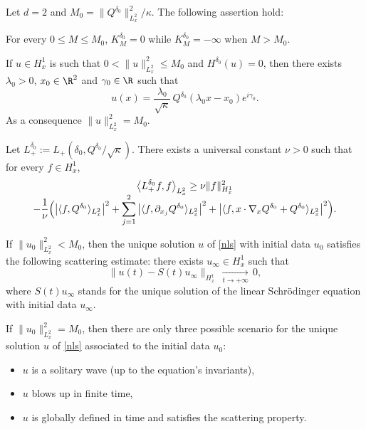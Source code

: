 \begin{theo}\label{th:218}
Let $d=2$ and $M_{0}=\|Q^{\delta_{0}}\|_{L_{x}^{2}}^{2}/\kappa$. The following assertion hold:
\begin{enumeratei}
\item\label{th:218i}
For every $0\leq M\leq M_{0}$, $K_{M}^{\delta_{0}}=0$ while $K_{M}^{\delta_{0}}=-\infty$ when $M>M_{0}$.
\item\label{th:218ii}
If $u\in H_{x}^{1}$ is such that $0<\|u\|_{L_{x}^{2}}^{2}\leq M_{0}$ and $H^{\delta_{0}}(u)=0$, then there exists $\lambda_{0}>0$, $x_{0}\in\R^{2}$ and $\gamma_{0}\in\R$ such that\vspace*{-3pt}
\[
u(x)=\frac{\lambda_{0}}{\sqrt{\kappa}}\,Q^{\delta_{0}}(\lambda_{0}x-x_{0})e^{i\gamma_{0}}.
\]
As a consequence $\|u\|_{L_{x}^{2}}^{2}=M_{0}$.
\item\label{th:218iii}
Let $L_{+}^{\delta_{0}}:=L_{+}(\delta_{0},Q^{\delta_{0}}/\sqrt{\kappa})$. There exists a universal constant $\nu>0$ such that for every $f\in H_{x}^{1}$,\vspace*{-5pt}
\begin{multline}\label{new_coercivity}
\bigl\langle L_{+}^{\delta_{0}}f,f\bigr\rangle_{L_{x}^{2}}
\geq\nu\|f\|_{H_{x}^{1}}^{2}\\[
-5pt]
-\frac{1}{\nu}\Bigl(\left|\langle f,Q^{\delta_{0}}\rangle_{L_{x}^{2}}\right|^{2}+\sum\limits_{j=1}^{2}\left|\langle f,\partial_{x_{j}}Q^{\delta_{0}}\rangle_{L_{x}^{2}}\right|^{2}+\left|\langle f,x\cdot\nabla_{x}Q^{\delta_{0}}+Q^{\delta_{0}}\rangle_{L_{x}^{2}}\right|^{2}\Bigr).
\end{multline}
\item\label{th:218iv}
If $\|u_{0}\|_{L_{x}^{2}}^{2}<M_{0}$, then the unique solution $u$ of \eqref{nls} with initial data $u_{0}$
satisfies the following
scattering estimate: there exists $u_{\infty}\in H_{x}^{1}$ such that
\[
\|u(t)-S(t)u_{\infty}\|_{H_{x}^{1}}\,\underset{t\to+\infty}{\to}\,0,
\]
where $S(t)u_{\infty}$ stands for the unique solution of the linear Schrödinger equation with initial data $u_{\infty}$.
\item\label{th:218v}
If $\|u_{0}\|_{L_{x}^{2}}^{2}=M_{0}$, then there are only three possible scenario for the unique solution $u$ of \eqref{nls} associated to the initial data $u_{0}$:
\begin{itemize}
\item $u$ is a solitary wave (up to the equation's invariants),
\item $u$ blows up in finite time,
\item $u$ is globally defined in time and satisfies the scattering property.
\end{itemize}
\end{enumeratei}
\end{theo}

